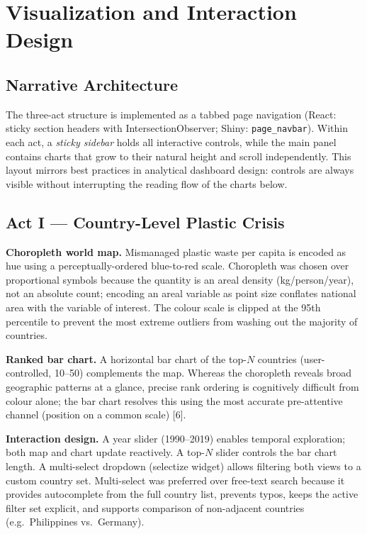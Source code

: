 \documentclass[10pt,twocolumn]{article}
\newcommand{\tool}[1]{\texttt{#1}}
\begin{document}
\section{Visualization and Interaction Design}

\subsection{Narrative Architecture}

The three-act structure is implemented as a tabbed page navigation (React:
sticky section headers with IntersectionObserver; Shiny: \tool{page\_navbar}).
Within each act, a \emph{sticky sidebar} holds all interactive controls, while
the main panel contains charts that grow to their natural height and scroll
independently.
This layout mirrors best practices in analytical dashboard design: controls
are always visible without interrupting the reading flow of the charts below.

\subsection{Act I --- Country-Level Plastic Crisis}

\textbf{Choropleth world map.}
Mismanaged plastic waste per capita is encoded as hue using a
perceptually-ordered blue-to-red scale.
Choropleth was chosen over proportional symbols because the quantity is an
areal density (kg/person/year), not an absolute count; encoding an areal
variable as point size conflates national area with the variable of interest.
The colour scale is clipped at the 95th percentile to prevent the most
extreme outliers from washing out the majority of countries.

\textbf{Ranked bar chart.}
A horizontal bar chart of the top-$N$ countries (user-controlled, 10--50)
complements the map.
Whereas the choropleth reveals broad geographic patterns at a glance, precise
rank ordering is cognitively difficult from colour alone; the bar chart
resolves this using the most accurate pre-attentive channel (position on a
common scale) [6].

\textbf{Interaction design.}
A year slider (1990--2019) enables temporal exploration; both map and chart
update reactively.
A top-$N$ slider controls the bar chart length.
A multi-select dropdown (selectize widget) allows filtering both views to a
custom country set.
Multi-select was preferred over free-text search because it provides
autocomplete from the full country list, prevents typos, keeps the active
filter set explicit, and supports comparison of non-adjacent countries
(e.g.\ Philippines vs.\ Germany).
\end{document}
